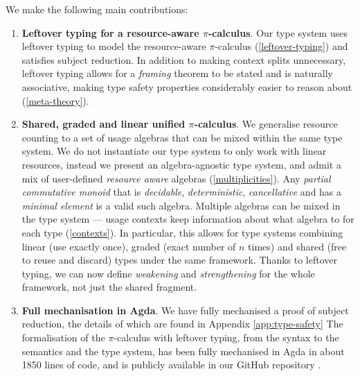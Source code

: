\documentclass[runningheads]{llncs}
\newcommand{\picalc}{$\pi$-calculus}
\begin{document}
We make the following main contributions:
\begin{enumerate}
  \item \textbf{Leftover typing for a resource-aware \picalc{}}. Our type system uses leftover typing to model the resource-aware \picalc{} (\autoref{leftover-typing}) and satisfies subject reduction.
    In addition to making context splits unnecessary, leftover typing allows for a \emph{framing} theorem to be stated and is naturally associative, making type safety properties considerably easier to reason about (\autoref{meta-theory}).
        
  \item \textbf{Shared, graded and linear unified \picalc{}}.
  We {generalise resource counting to a set of usage algebras that can be mixed within the same type system}.
    We do not instantiate our type system to only work with linear resources, instead we present an algebra-agnostic type system, and admit a mix of user-defined \emph{resource aware} algebras (\autoref{multiplicities}).
    Any \emph{partial commutative monoid} that is \emph{decidable}, \emph{deterministic}, \emph{cancellative} and has a \emph{minimal element} is a valid such algebra.
    Multiple algebras can be mixed in the type system --- usage contexts keep information about what algebra to for each type (\autoref{contexts}).
    In particular, this allows for type systems combining linear (use exactly once), graded (exact number of $n$ times) and shared (free to reuse and discard) types under the same framework.
    Thanks to leftover typing, we can now define \emph{weakening} and \emph{strengthening} for the whole framework, not just the shared fragment.
    
    \item \textbf{Full mechanisation in Agda}. We have fully mechanised a proof of subject reduction, the details of which are found in Appendix \ref{app:type-safety}
The formalisation of the \picalc{} with leftover typing, from the syntax to the semantics and the type system, has been fully mechanised in Agda in about 1850 lines of code, and is publicly available in our GitHub repository \cite{Zalakain2020Agda}.

\end{enumerate}
\end{document}
